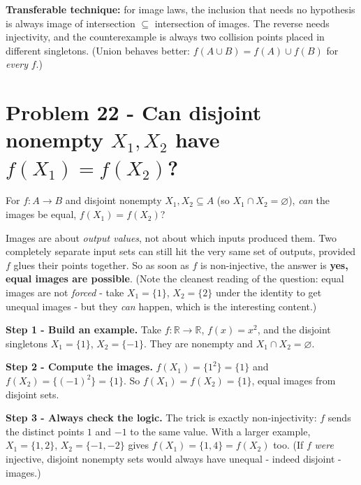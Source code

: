 \documentclass[11pt,a4paper]{article}
\newcommand{\R}{\mathbb{R}}
\begin{document}
\begin{methodbox}
\textbf{Transferable technique:} for image laws, the inclusion that needs no hypothesis is always
\textquotedbl{}image of intersection $\subseteq$ intersection of images.\textquotedbl{} The reverse
needs injectivity, and the counterexample is always two collision points placed in different
singletons. (Union behaves better: $f(A\cup B)=f(A)\cup f(B)$ for \emph{every} $f$.)
\end{methodbox}

\section*{Problem 22 - Can disjoint nonempty $X_1,X_2$ have $f(X_1)=f(X_2)$?}

\begin{problembox}[22]
For $f:A\to B$ and disjoint nonempty $X_1,X_2\subseteq A$ (so $X_1\cap X_2=\varnothing$),
\emph{can} the images be equal, $f(X_1)=f(X_2)$?
\end{problembox}

\begin{ideabox}
Images are about \emph{output values}, not about which inputs produced them. Two completely
separate input sets can still hit the very same set of outputs, provided $f$ glues their points
together. So as soon as $f$ is non-injective, the answer is \textbf{yes, equal images are possible}.
(Note the cleanest reading of the question: equal images are not \emph{forced} - take $X_1=\{1\}$,
$X_2=\{2\}$ under the identity to get unequal images - but they \emph{can} happen, which is the
interesting content.)
\end{ideabox}

\textbf{Step 1 - Build an example.} Take $f:\R\to\R$, $f(x)=x^2$, and the disjoint singletons
$X_1=\{1\}$, $X_2=\{-1\}$. They are nonempty and $X_1\cap X_2=\varnothing$.

\textbf{Step 2 - Compute the images.} $f(X_1)=\{1^2\}=\{1\}$ and $f(X_2)=\{(-1)^2\}=\{1\}$. So
$f(X_1)=f(X_2)=\{1\}$, equal images from disjoint sets.

\textbf{Step 3 - Always check the logic.} The trick is exactly non-injectivity: $f$ sends the
distinct points $1$ and $-1$ to the same value. With a larger example, $X_1=\{1,2\}$,
$X_2=\{-1,-2\}$ gives $f(X_1)=\{1,4\}=f(X_2)$ too. (If $f$ \emph{were} injective, disjoint nonempty
sets would always have unequal - indeed disjoint - images.)
\end{document}
